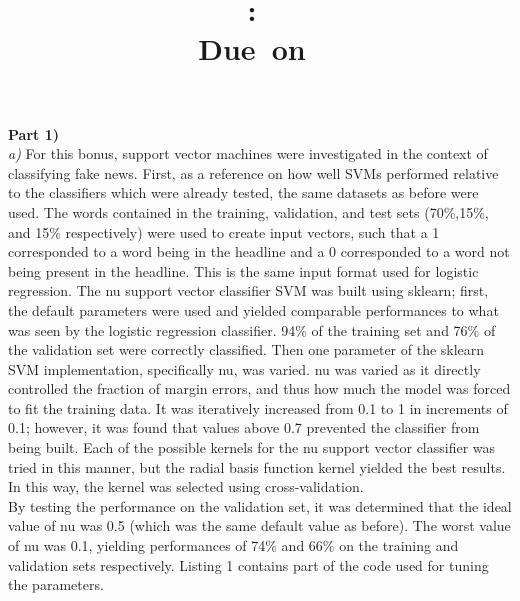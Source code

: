 \documentclass{article}
\title{
\vspace{2in}
\textmd{\textbf{\hmwkClass:\ \hmwkTitle}}\\
\normalsize\vspace{0.1in}\small{Due\ on\ \hmwkDueDate}\\
\vspace{0.1in}
\vspace{3in}
}
\author{\textbf{\hmwkAuthorName}}
\date{} %
\begin{document}
\maketitle
\clearpage
\textbf{Part 1)}\\
\textit{a)} For this bonus, support vector machines were investigated in the context of classifying fake news. First, as a reference on how well SVMs performed relative to the classifiers which were already tested, the same datasets as before were used. The words contained in the training, validation, and test sets (70\%,15\%, and 15\% respectively) were used to create input vectors, such that a 1 corresponded to a word being in the headline and a 0 corresponded to a word not being present in the headline. This is the same input format used for logistic regression. The nu support vector classifier SVM was built using sklearn; first, the default parameters were used and yielded comparable performances to what was seen by the logistic regression classifier. 94\% of the training set and 76\% of the validation set were correctly classified. Then one parameter of the sklearn SVM implementation, specifically nu, was varied. nu was varied as it directly controlled the fraction of margin errors, and thus how much the model was forced to fit the training data. It was iteratively increased from 0.1 to 1 in increments of 0.1; however, it was found that values above 0.7 prevented the classifier from being built. Each of the possible kernels for the nu support vector classifier was tried in this manner, but the radial basis function kernel yielded the best results. In this way, the kernel was selected using cross-validation.\\

By testing the performance on the validation set, it was determined that the ideal value of nu was 0.5 (which was the same default value as before). The worst value of nu was 0.1, yielding performances of 74\% and 66\% on the training and validation sets respectively. Listing 1 contains part of the code used for tuning the parameters.
\end{document}
